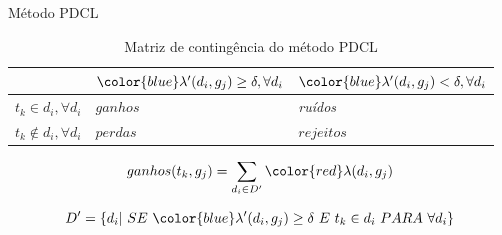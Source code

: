 \documentclass[brazil]{beamer}
\begin{document}
\begin{frame}{Método PDCL}
  \begin{table}[!htp]
    \centering
    \begin{tabular}{ |p{2cm}|p{3cm}|p{3cm}|}
      \cline{2-3}
      \multicolumn{1}{p{2cm}|}{} & ${\color{blue}\lambda'(d_i,g_j)} \geq \delta, \forall d_i$ &
      ${\color{blue}\lambda'(d_i,g_j)} < \delta, \forall d_i$ \\
      \hline
      $t_k \in d_i, \forall d_i$ & \parbox[c]{2cm}{\centering $ganhos$} &
      \parbox[c]{2cm}{\centering \it ruídos\/} \\
      \hline
      $t_k \not\in d_i, \forall d_i$ & \parbox[c]{2cm}{\centering $perdas$} &
      \parbox[c]{2cm}{\centering $rejeitos$} \\
      \hline
    \end{tabular}
    \caption{Matriz de contingência do método PDCL}
    \label{table:softmatrix}
  \end{table}
  \begin{equation}
    ganhos(t_k,g_j) = 
    \sum_{ d_i \in D' } {\color{red}\lambda(d_i,g_j)}
  \end{equation}

  \begin{equation}
    D' = \{ d_i | \ SE\ {\color{blue}\lambda'(d_i,g_j)} \geq \delta\ E\ t_k \in d_i\ PARA\ \forall
    d_i \}
  \end{equation}
\end{frame}
\end{document}
